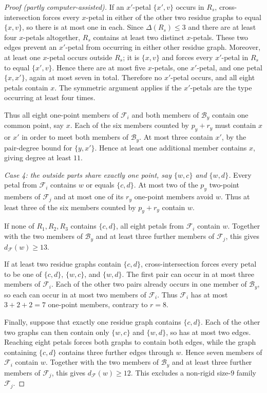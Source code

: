 \documentclass[11pt]{article}
\numberwithin{equation}{section}
\theoremstyle{definition}
\theoremstyle{remark}
\newcommand{\F}{\mathcal F}
\newcommand{\B}{\mathcal B}
\begin{document}
\begin{proof}[Proof (partly computer-assisted)]
If an $x'$-petal $\{x',v\}$ occurs in $R_s$, cross-intersection forces every
$x$-petal in either of the other two residue graphs to equal $\{x,v\}$, so
there is at most one in each. Since $\Delta(R_s)\le3$ and there are at least
four $x$-petals altogether, $R_s$ contains at least two distinct
$x$-petals. These two edges prevent an $x'$-petal from occurring in either
other residue graph. Moreover, at least one $x$-petal occurs outside $R_s$;
it is $\{x,v\}$ and forces every $x'$-petal in $R_s$ to equal
$\{x',v\}$. Hence there are at most five $x$-petals, one $x'$-petal, and
one petal $\{x,x'\}$, again at most seven in total. Therefore no
$x'$-petal occurs, and all eight petals contain $x$. The symmetric argument
applies if the $x'$-petals are the type occurring at least four times.

Thus all eight one-point members of $\F_i$ and both members of $\B_y$
contain one common point, say $x$. Each of the six members counted by
$p_y+r_y$ must contain $x$ or $x'$ in order to meet both members of
$\B_y$. At most three contain $x'$, by the pair-degree bound for
$\{y,x'\}$. Hence at least one additional member contains $x$, giving
degree at least $11$.

\emph{Case 4: the outside parts share exactly one point, say $\{w,c\}$ and
$\{w,d\}$.}  Every petal from
$\F_i$ contains $w$ or equals $\{c,d\}$. At most two of the $p_y$ two-point
members of $\F_j$ and at most one of its $r_y$ one-point members avoid $w$.
Thus at least three of the six members counted by $p_y+r_y$ contain $w$.

If none of $R_1,R_2,R_3$ contains $\{c,d\}$, all eight petals from $\F_i$
contain $w$. Together with the two members of $\B_y$ and at least three
further members of $\F_j$, this gives $d_{\F}(w)\ge13$.

If at least two residue graphs contain $\{c,d\}$, cross-intersection forces
every petal to be one of $\{c,d\}$, $\{w,c\}$, and $\{w,d\}$. The first
pair can occur in at most three members of $\F_i$. Each of the other two
pairs already occurs in one member of $\B_y$, so each can occur in at most
two members of $\F_i$. Thus $\F_i$ has at most $3+2+2=7$ one-point
members, contrary to $r=8$.

Finally, suppose that exactly one residue graph contains $\{c,d\}$. Each
of the other two graphs can then contain only $\{w,c\}$ and $\{w,d\}$, so
has at most two edges. Reaching eight petals forces both graphs to contain
both edges, while the graph containing $\{c,d\}$ contains three further
edges through $w$. Hence seven members of $\F_i$ contain $w$. Together
with the two members of $\B_y$ and at least three further members of $\F_j$,
this gives $d_{\F}(w)\ge12$. This excludes a non-rigid size-$9$ family
$\F_j$.


\end{proof}
\end{document}

